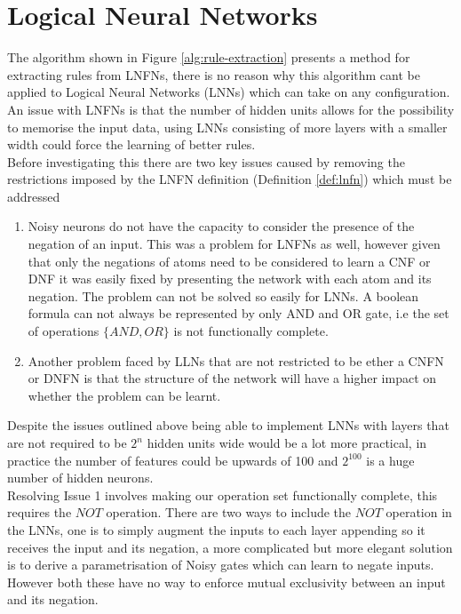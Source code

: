 \chapter{Logical Neural Networks}
The algorithm shown in Figure \ref{alg:rule-extraction} presents a method for extracting rules from LNFNs, there is no reason why this algorithm cant be applied to Logical Neural Networks (LNNs) \cite{LearningLogicalActivations} which can take on any configuration.\\

An issue with LNFNs is that the number of hidden units allows for the possibility to memorise the input data, using LNNs consisting of more layers with a smaller width could force the learning of better rules.\\

Before investigating this there are two key issues caused by removing the restrictions imposed by the LNFN definition (Definition \ref{def:lnfn}) which must be addressed 

\begin{enumerate}
	\item Noisy neurons do not have the capacity to consider the presence of the negation of an input. This was a problem for LNFNs as well, however given that only the negations of atoms need to be considered to learn a CNF or DNF it was easily fixed by presenting the network with each atom and its negation. The problem can not be solved so easily for LNNs. A boolean formula can not always be represented by only AND and OR gate, i.e the set of operations $\{AND, OR\}$ is not functionally complete. 
	
	\item Another problem faced by LLNs that are not restricted to be ether a CNFN or DNFN is that the structure of the network will have a higher impact on whether the problem can be learnt. 
\end{enumerate}

Despite the issues outlined above being able to implement LNNs with layers that are not required to be $2^n$ hidden units wide would be a lot more practical, in practice the number of features could be upwards of 100 and $2^{100}$ is a huge number of hidden neurons.\\

Resolving Issue 1 involves making our operation set functionally complete, this requires the $NOT$ operation. There are two ways to include the $NOT$ operation in the LNNs, one is to simply augment the inputs to each layer appending so it receives the input and its negation, a more complicated but more elegant solution is to derive a parametrisation of Noisy gates which can learn to negate inputs. However both these have no way to enforce mutual exclusivity between an input and its negation.\\

